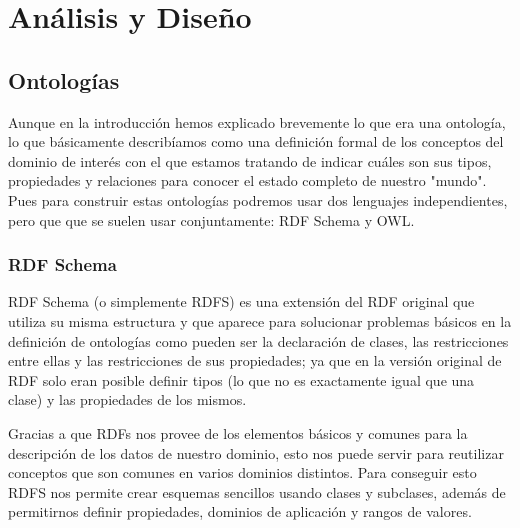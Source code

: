 \chapter{Análisis y Diseño}

\section{Ontologías}
Aunque en la introducción hemos explicado brevemente lo que era una ontología, lo que básicamente describíamos como una definición formal de los conceptos del dominio de interés con el que estamos tratando de indicar cuáles son sus tipos, propiedades y relaciones para conocer el estado completo de nuestro "mundo". Pues para construir estas ontologías podremos usar dos lenguajes independientes, pero que que se suelen usar conjuntamente: RDF Schema y OWL.

\subsection{RDF Schema}
RDF Schema (o simplemente RDFS) es una extensión del RDF original que utiliza su misma estructura y que aparece para solucionar problemas básicos en la definición de ontologías como pueden ser la declaración de clases, las restricciones entre ellas y las restricciones de sus propiedades; ya que en la versión original de RDF solo eran posible definir tipos (lo que no es exactamente igual que una clase) y las propiedades de los mismos.

\bigskip
Gracias a que RDFs nos provee de los elementos básicos y comunes para la descripción de los datos de nuestro dominio, esto nos puede servir para reutilizar conceptos que son comunes en varios dominios distintos. Para conseguir esto RDFS nos permite crear esquemas sencillos usando clases y subclases, además de permitirnos definir propiedades, dominios de aplicación y rangos de valores.

